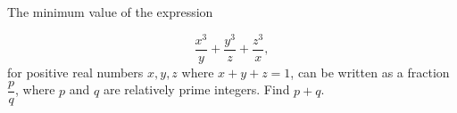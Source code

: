 The minimum value of the expression

$$\dfrac{x^3}{y}+\dfrac{y^3}{z}+\dfrac{z^3}{x},$$for positive real numbers $x,y,z$ where $x+y+z=1$, can be written as a fraction $\dfrac{p}{q}$, where $p$ and $q$ are relatively prime integers. Find $p+q$.
